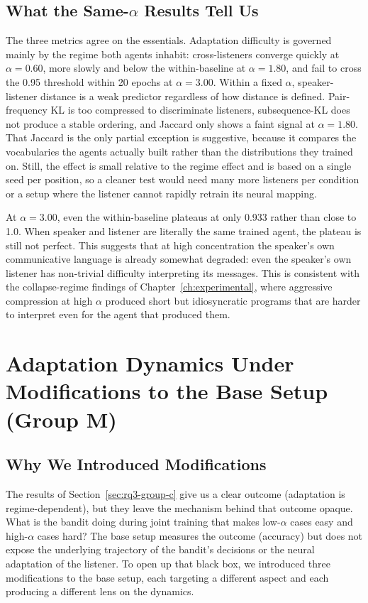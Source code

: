 \subsection{What the Same-$\alpha$ Results Tell Us}
\label{sec:rq3-c-interpretation}

The three metrics agree on the essentials. Adaptation difficulty is governed mainly by the regime both agents inhabit: cross-listeners converge quickly at $\alpha = 0.60$, more slowly and below the within-baseline at $\alpha = 1.80$, and fail to cross the 0.95 threshold within 20 epochs at $\alpha = 3.00$. Within a fixed $\alpha$, speaker-listener distance is a weak predictor regardless of how distance is defined. Pair-frequency KL is too compressed to discriminate listeners, subsequence-KL does not produce a stable ordering, and Jaccard only shows a faint signal at $\alpha = 1.80$. That Jaccard is the only partial exception is suggestive, because it compares the vocabularies the agents actually built rather than the distributions they trained on. Still, the effect is small relative to the regime effect and is based on a single seed per position, so a cleaner test would need many more listeners per condition or a setup where the listener cannot rapidly retrain its neural mapping.

At $\alpha = 3.00$, even the within-baseline plateaus at only 0.933 rather than close to 1.0. When speaker and listener are literally the same trained agent, the plateau is still not perfect. This suggests that at high concentration the speaker's own communicative language is already somewhat degraded: even the speaker's own listener has non-trivial difficulty interpreting its messages. This is consistent with the collapse-regime findings of Chapter~\ref{ch:experimental}, where aggressive compression at high $\alpha$ produced short but idiosyncratic programs that are harder to interpret even for the agent that produced them.

\section{Adaptation Dynamics Under Modifications to the Base Setup (Group M)}
\label{sec:rq3-group-m}

\subsection{Why We Introduced Modifications}
\label{sec:rq3-m-motivation}

The results of Section~\ref{sec:rq3-group-c} give us a clear outcome (adaptation is regime-dependent), but they leave the mechanism behind that outcome opaque. What is the bandit doing during joint training that makes low-$\alpha$ cases easy and high-$\alpha$ cases hard? The base setup measures the outcome (accuracy) but does not expose the underlying trajectory of the bandit's decisions or the neural adaptation of the listener. To open up that black box, we introduced three modifications to the base setup, each targeting a different aspect and each producing a different lens on the dynamics.


